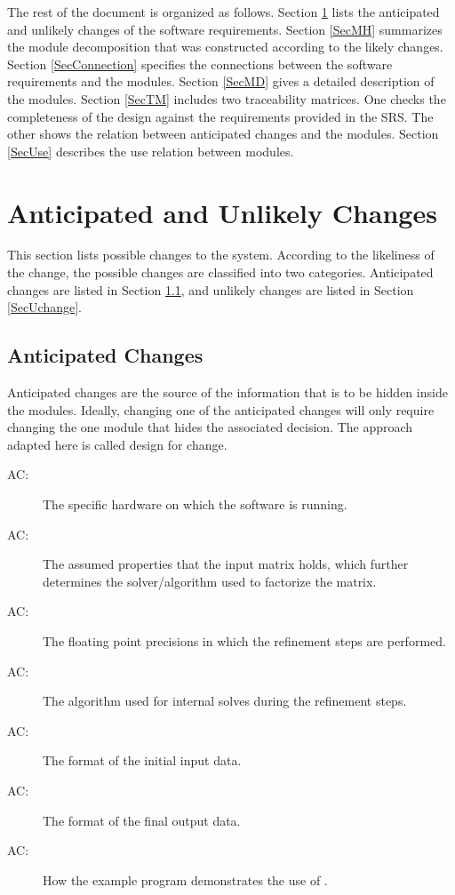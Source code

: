 \documentclass[12pt, titlepage]{article}
\newcounter{acnum}
\newcommand{\actheacnum}{AC\theacnum}
\begin{document}
The rest of the document is organized as follows. Section
\ref{SecChange} lists the anticipated and unlikely changes of the software
requirements. Section \ref{SecMH} summarizes the module decomposition that
was constructed according to the likely changes. Section \ref{SecConnection}
specifies the connections between the software requirements and the
modules. Section \ref{SecMD} gives a detailed description of the
modules. Section \ref{SecTM} includes two traceability matrices. One checks
the completeness of the design against the requirements provided in the SRS. The
other shows the relation between anticipated changes and the modules. Section
\ref{SecUse} describes the use relation between modules.

\section{Anticipated and Unlikely Changes} \label{SecChange}

This section lists possible changes to the system. According to the likeliness
of the change, the possible changes are classified into two
categories. Anticipated changes are listed in Section \ref{SecAchange}, and
unlikely changes are listed in Section \ref{SecUchange}.

\subsection{Anticipated Changes} \label{SecAchange}

Anticipated changes are the source of the information that is to be hidden
inside the modules. Ideally, changing one of the anticipated changes will only
require changing the one module that hides the associated decision. The approach
adapted here is called design for change.

\begin{description}
\item[ \actheacnum \label{AC:hw}:] The specific hardware on
  which the software is running.
\item[ \actheacnum \label{AC:factor}:] The assumed properties
  that the input matrix holds, which further determines the solver/algorithm
  used to factorize the matrix.
\item[ \actheacnum \label{AC:precision}:] The floating point
  precisions in which the refinement steps are performed.
\item[ \actheacnum \label{AC:solve}:] The algorithm used for
  internal solves during the refinement steps.

\item[ \actheacnum \label{AC:input}:] The format of the
  initial input data.
\item[ \actheacnum \label{AC:output}:] The format of the
  final output data.
\item[ \actheacnum \label{AC:example}:] How the example
  program demonstrates the use of \progname{}.
\end{description}
\end{document}
